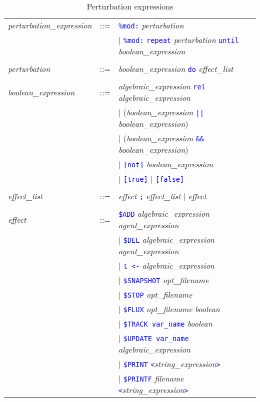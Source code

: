\documentclass[11pt]{book}
\def\tcb#1{\textcolor{blue}{\ttt{#1}}}
\def\ttt#1{\texttt{#1}}
\def\var#1{\textquotesingle #1\textquotesingle}
\begin{document}
\begin{table}[htbp]
  \centering
  \caption{Perturbation expressions}
  \begin{tabular}{@{} lcl @{}}
  	\textit{perturbation\_expression} &::=& \tcb{\ttt{\%mod:}} \textit{perturbation} \\
	&& | \tcb{\ttt{\%mod:}} \tcb{\ttt{repeat}} \textit{perturbation} \tcb{\ttt{until}} \textit{boolean\_expression} \\\\ 
    
    \textit{perturbation} &::=& \textit{boolean\_expression} \tcb{\ttt{do}} \textit{effect\_list} \\\\
    \textit{boolean\_expression} &::=& \textit{algebraic\_expression}\index{boolean expression} \tcb{rel} \textit{algebraic\_expression} \\
    && | (\textit{boolean\_expression} \tcb{||} \textit{boolean\_expression}) \\
    && | (\textit{boolean\_expression} \tcb{\&\&} \textit{boolean\_expression}) \\
    && | \tcb{[not]} \textit{boolean\_expression} \\
    && | \tcb{[true]} | \tcb{[false]} \\\\
    \textit{effect\_list} &::=& \textit{effect} \tcb{\ttt {;}} \textit{effect\_list} | \textit{effect} \\\\
\textit{effect} &::=& \tcb{\$ADD} \textit{algebraic\_expression agent\_expression} \\
    && | \tcb{\$DEL} \textit{algebraic\_expression agent\_expression} \\
    && | \tcb{t <-} \textit{algebraic\_expression} \\
    && | \tcb{\$SNAPSHOT} \textit{opt\_filename}\\ 
    && | \tcb{\$STOP} \textit{opt\_filename}\\
	&& | \tcb{\$FLUX} \textit{opt\_filename} \textit{boolean} \\
    && | \tcb{\$TRACK \var{var\_name}} \textit{boolean} \\
    && | \tcb{\$UPDATE \var{var\_name}} \textit{algebraic\_expression} \\
    && | \tcb{\$PRINT} \tcb{<}\textit{string\_expression}\tcb{>} \\
    && | \tcb{\$PRINTF} \textit{filename} \tcb{<}\textit{string\_expression}\tcb{>} \\

\end{tabular}
\end{table}
\end{document}

